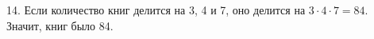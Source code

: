 14. Если количество книг делится на 3, 4 и 7, оно делится на $3\cdot4\cdot7=84.$ Значит, книг было 84.\\
